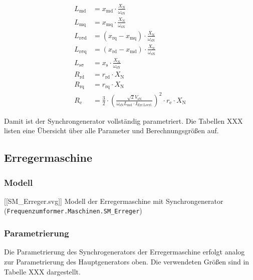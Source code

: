 \begin{align}
L_{\mathrm{md}} &= x_{\mathrm{md}}\cdot \frac{X_{\mathrm{N}}}{\omega_{\mathrm{sN}}} \\
L_{\mathrm{mq}} &= x_{\mathrm{mq}}\cdot \frac{X_{\mathrm{N}}}{\omega_{\mathrm{sN}}} \\
L_{\mathrm{r \sigma d}} &= (x_{\mathrm{rq}}-x_{\mathrm{mq}})\cdot \frac{X_{\mathrm{N}}}{\omega_{\mathrm{sN}}} \\
L_{\mathrm{r \sigma q}} &= (x_{\mathrm{rd}}-x_{\mathrm{md}})\cdot \frac{X_{\mathrm{N}}}{\omega_{\mathrm{sN}}} \\
L_{\mathrm{s \sigma}} &= x_{\mathrm{s}}\cdot \frac{X_{\mathrm{N}}}{\omega_{\mathrm{sN}}} \\
R_{\mathrm{rd}} &= r_{\mathrm{rd}}\cdot X_{\mathrm{N}} \\
R_{\mathrm{rq}} &= r_{\mathrm{rq}}\cdot X_{\mathrm{N}} \\
R_{\mathrm{e}} &= \frac{3}{2}\cdot \left(\frac{\sqrt{2}V_{\mathrm{sN}}}{\omega_{\mathrm{sN}}L_{\mathrm{md}}\cdot I_{\mathrm{Err. Leerl.}}}\right)^2\cdot r_{\mathrm{e}}\cdot X_{\mathrm{N}}
\end{align}

Damit ist der Synchrongenerator vollständig parametriert. Die Tabellen
XXX listen eine Übersicht über alle Parameter und Berechnungsgrößen auf.

\hypertarget{erregermaschine}{%
\subsection{Erregermaschine}\label{erregermaschine}}

\hypertarget{modell-2}{%
\subsubsection{Modell}\label{modell-2}}

{[}{[}SM\_Erreger.svg{]}{]} Modell der Erregermaschine mit
Synchrongenerator (\texttt{Frequenzumformer.Maschinen.SM\_Erreger})

\hypertarget{parametrierung-2}{%
\subsubsection{Parametrierung}\label{parametrierung-2}}

Die Parametrierung des Synchrogenerators der Erregermaschine erfolgt
analog zur Parametrierung des Hauptgenerators oben. Die verwendeten
Größen sind in Tabelle XXX dargestellt.

